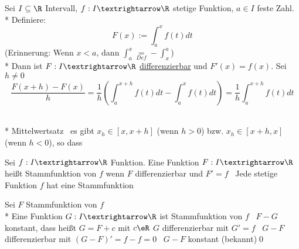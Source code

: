 Sei $I\subseteq\R$ Intervall, $f:I→\R$ stetige Funktion, $a\in I$ feste Zahl.\\*
Definiere: $$F(x):=\int_a^x f(t)dt$$
(Erinnerung: Wenn $x<a$, dann $\int_a^x\underset{Def}{=}-\int_x^a$)\\*
Dann ist $F:I→\R$ \ul{differenzierbar} und $F'(x)=f(x)$.
\bew
Sei $h≠0$ $$\frac{F(x+h)-F(x)}{h}=\frac{1}{h}\left(\int_a^{x+h}f(t)dt-\int_a^xf(t)dt\right)=\frac{1}{h}\int_a^{x+h}f(t)dt$$
\\*
Mittelwertsatz \Rarr\ es gibt $x_h\in[x,x+h]$ (wenn $h>0$) bzw. $x_h\in[x+h,x]$ (wenn $h<0$), so dass

Sei $f:I→\R$ Funktion. Eine Funktion $F:I→\R$ heißt Stammfunktion von $f$ wenn $F$ differenzierbar und $F'=f$
 \Rarr\ Jede stetige Funktion $f$ hat eine Stammfunktion

Sei $F$ Stammfunktion von $f$\\*
Eine Funktion $G:I→\R$ ist Stammfunktion von $f$ \equ\ $F-G$ konstant, dass heißt $G=F+c$ mit $c\eR$
\bew
$G$ differenzierbar mit $G'=f$ \equ\ $G-F$ differenzierbar mit $(G-F)'=f-f=0$ \equ\ $G-F$ konstant (bekannt)\qed

